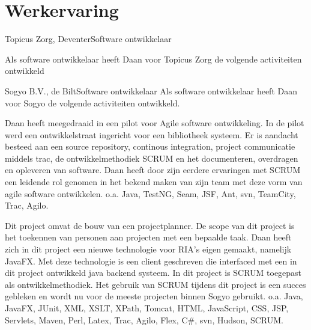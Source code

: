 \section*{Werkervaring}

	\begin{workExperience}{Topicus Zorg, Deventer}{Software ontwikkelaar}{}
		
		Als software ontwikkelaar heeft Daan voor Topicus Zorg de volgende
		activiteiten ontwikkeld
		
		
		
	\end{workExperience}

	\begin{workExperience}{Sogyo B.V., de Bilt}{Software ontwikkelaar}{}
		Als software ontwikkelaar heeft Daan voor Sogyo de volgende 
		activiteiten ontwikkeld.
		
		Daan heeft meegedraaid in een pilot voor Agile software ontwikkeling. In
		de pilot werd een ontwikkelstraat ingericht voor een bibliotheek 
		systeem. Er is aandacht besteed aan	een source repository, continous 
		integration, project communicatie middels trac, de ontwikkelmethodiek 
		SCRUM en het documenteren, overdragen en opleveren van software.
		Daan heeft door zijn eerdere ervaringen met SCRUM een leidende rol
		genomen in het bekend maken van zijn team met deze vorm van agile 
		software ontwikkelen.
		\technics o.a. Java, TestNG, Seam, JSF, Ant, svn, TeamCity, Trac, Agilo.
		
		Dit project omvat de bouw van een projectplanner. De scope van dit 
		project is het toekennen van personen aan projecten met een bepaalde 
		taak. Daan heeft zich in dit project een nieuwe technologie voor RIA's 
		eigen gemaakt, namelijk JavaFX. Met deze technologie is een client 
		geschreven die interfaced met een in dit project ontwikkeld java backend
		systeem. In dit project is SCRUM toegepast als ontwikkelmethodiek. Het 
		gebruik van SCRUM tijdens dit project is een succes gebleken en wordt nu
		voor de meeste projecten binnen Sogyo gebruikt.
		\technics o.a. Java, JavaFX, JUnit, XML, XSLT, XPath, Tomcat, HTML, 
		JavaScript, CSS, JSP, Servlets, Maven, Perl, Latex, Trac, Agilo, Flex, 
		C\#, svn, Hudson, SCRUM.


\end{workExperience}
